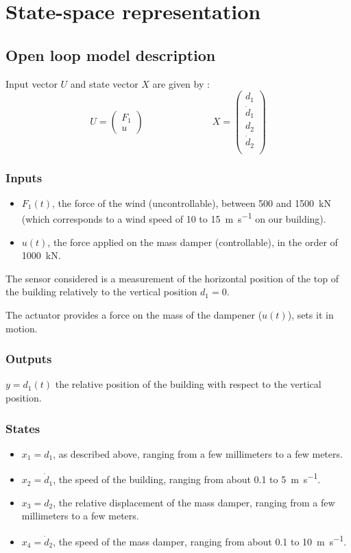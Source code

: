 \section{State-space representation}

\subsection{Open loop model description}
Input vector $U$ and state vector $X$ are given by :
$$
U = \begin{pmatrix}
    F_1 \\
    u
\end{pmatrix}
\hspace{3cm}
X = \begin{pmatrix}
    d_1 \\
    \dot d_1 \\
    d_2 \\ 
    \dot d_2 \\
\end{pmatrix}
$$

\subsubsection{Inputs}
\begin{itemize}
    \item $F_1(t)$, the force of the wind (uncontrollable), between \num{500} and \SI{1500}{\kilo\newton} (which corresponds to a wind speed of \num{10} to \SI{15}{\meter\per\second} on our building).
    \item $u(t)$, the force applied on the mass damper (controllable), in the order of \SI{1000}{\kilo\newton}.
\end{itemize}
The sensor considered is a measurement of the horizontal position of the top of the building relatively to the vertical position $d_1 = 0$.\par
The actuator provides a force on the mass of the dampener ($u(t)$), sets it in motion.

\subsubsection{Outputs}
$y = d_1(t)$ the relative position of the building with respect to the vertical position.

\subsubsection{States}
\begin{itemize}
    \item $x_1 = d_1$, as described above, ranging from a few millimeters to a few meters.
    \item $x_2 = \dot d_1$, the speed of the building, ranging from about \num{0.1} to \SI{5}{\meter\per\second}.
    \item $x_3 = d_2$, the relative displacement of the mass damper, ranging from a few millimeters to a few meters.
    \item $x_4 = \dot d_2$, the speed of the mass damper, ranging from about \num{0.1} to \SI{10}{\meter\per\second}.
\end{itemize}


